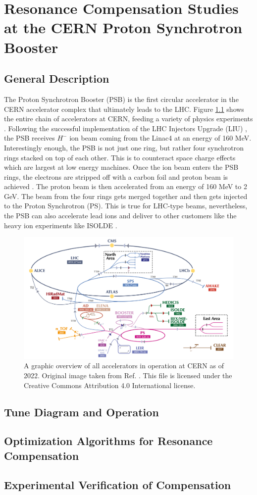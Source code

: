 \chapter{Resonance Compensation Studies at the CERN Proton Synchrotron Booster}
\label{sec:ch5}

\section{General Description}
The Proton Synchrotron Booster (PSB) is the first circular accelerator in the CERN accelerator complex that ultimately leads to the LHC. Figure \ref{fig:cernac} shows the entire chain of accelerators at CERN, feeding a variety of physics experiments \cite{cernplot}. Following the successful implementation of the LHC Injectors Upgrade (LIU) \cite{liu}, the PSB receives $H^-$ ion beam coming from the Linac4 at an energy of 160 MeV. Interestingly enough, the PSB is not just one ring, but rather four synchrotron rings stacked on top of each other. This is to counteract space charge effects which are largest at low energy machines. Once the ion beam enters the PSB rings, the electrons are stripped off with a carbon foil and proton beam is achieved \cite{psbstrip}. The proton beam is then accelerated from an energy of 160 MeV to 2 GeV. The beam from the four rings gets merged together and then gets injected to the Proton Synchrotron (PS). This is true for LHC-type beams, nevertheless, the PSB can also accelerate lead ions and deliver to other customers like the heavy ion experiments like ISOLDE \cite{foteini1}.   \cite{foteini2} 

\begin{figure}[H]
    \centering
    \includegraphics[width=\linewidth]{chapter5/CERN_AC.png}
    \caption{A graphic overview of all accelerators in operation at CERN as of 2022. Original image taken from Ref. \cite{cernplot}. This file is licensed under the Creative Commons Attribution 4.0 International license.}
    \label{fig:cernac}
 \end{figure}

\section{Tune Diagram and Operation}

\section{Optimization Algorithms for Resonance Compensation}

\section{Experimental Verification of Compensation}
